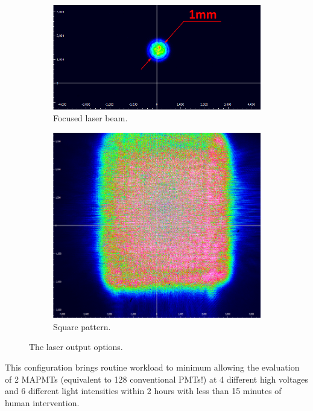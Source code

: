 \documentclass[5p,times,preprint]{elsarticle}
\begin{document}
\begin{figure}[bt]
	\centering
	\begin{subfigure}[b]{0.628\linewidth}
		\includegraphics[width=\textwidth]{beamspot.pdf}
		\caption{Focused laser beam.}
		\label{fig:beamopt1}
	\end{subfigure}
	\begin{subfigure}[b]{0.354\linewidth}
		\includegraphics[width=\textwidth]{beamsquare.pdf}
		\caption{Square pattern.}
		\label{fig:beamopt2}
	\end{subfigure}
	\caption{The laser output options.}
\end{figure}

This configuration brings routine workload to minimum allowing the evaluation of 2 MAPMTs (equivalent to 128 conventional PMTs!) at 4 different high voltages and 6 different light intensities within 2 hours with less than 15 minutes of human intervention.
\end{document}
